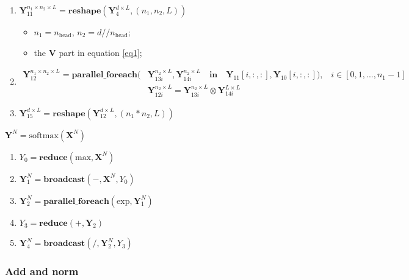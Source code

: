 \begin{enumerate}
  \item $\mathbf{Y}_{11}^{n_1 \times n_2 \times L} = \textbf{reshape}(\mathbf{Y}_4^{d \times L}, (n_1, n_2, L))$
  \begin{itemize}
    \item $n_1 = n_{\text{head}}$, $n_2 = d // n_{\text{head}}$;
    \item the $\mathbf{V}$ part in equation \eqref{eq1};
  \end{itemize}

  \item \begin{equation*}
    \begin{aligned}
    \mathbf{Y}_{12}^{n_1 \times n_2 \times L} = \textbf{parallel\_foreach} ( &\mathbf{Y}_{13i}^{n_2 \times L}, \mathbf{Y}_{14i}^{n_2 \times L} \quad \textbf{in} \quad \mathbf{Y}_{11}[i,:,:], \mathbf{Y}_{10}[i,:,:]) \text{,} \quad i \in [0,1,...,n_1 - 1] \\
    & \mathbf{Y}_{12i}^{n_2 \times L} = \mathbf{Y}_{13i}^{n_2 \times L} \otimes \mathbf{Y}_{14i}^{L \times L}
    \end{aligned}
  \end{equation*}

  \item $\mathbf{Y}_{15}^{d \times L} = \textbf{reshape}(\mathbf{Y}_{12}^{d \times L}, (n_1 * n_2, L))$

\end{enumerate}

\begin{info}

$\mathbf{Y}^{N} = \text{softmax}(\mathbf{X}^N)$
\begin{enumerate}
  \item $Y_0 = \textbf{reduce}(\text{max}, \mathbf{X}^N)$
  \item $\mathbf{Y}_1^{N} = \textbf{broadcast}(-, \mathbf{X}^N, Y_0)$
  \item $\mathbf{Y}_2^{N} = \textbf{parallel\_foreach}(\text{exp}, \mathbf{Y}_1^N)$
  \item $Y_3 = \textbf{reduce}(\text{+}, \mathbf{Y}_2)$
  \item $\mathbf{Y}_4^{N} = \textbf{broadcast}(/, \mathbf{Y}_2^{N}, Y_3)$
\end{enumerate}
\end{info}

\subsubsection{Add and norm}

